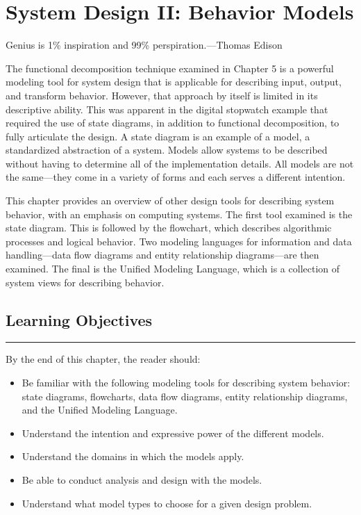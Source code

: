 \chapter{System Design II: Behavior Models}
\label{chapter:behaviorModels}
\graphicspath{ {./chapter06/Fig} }

\begin{itquote}
Genius is 1\% inspiration and 99\% perspiration.---Thomas Edison
\end{itquote}


The functional decomposition technique examined in Chapter 5 is a
powerful modeling tool for system design that is applicable for
describing input, output, and transform behavior. However, that approach
by itself is limited in its descriptive ability. This was apparent in
the digital stopwatch example that required the use of state diagrams,
in addition to functional decomposition, to fully articulate the design.
A state diagram is an example of a model, a standardized abstraction of
a system. Models allow systems to be described without having to
determine all of the implementation details. All models are not the
same---they come in a variety of forms and each serves a different
intention.

This chapter provides an overview of other design tools for describing
system behavior, with an emphasis on computing systems. The first tool
examined is the state diagram. This is followed by the flowchart, which
describes algorithmic processes and logical behavior. Two modeling
languages for information and data handling---data flow diagrams and
entity relationship diagrams---are then examined. The final is the
Unified Modeling Language, which is a collection of system views for
describing behavior.

\section*{Learning Objectives}
\noindent\rule{\linewidth}{1pt}
By the end of this chapter, the reader should:

\begin{itemize}
\item
  Be familiar with the following modeling tools for describing system
  behavior: state diagrams, flowcharts, data flow diagrams, entity
  relationship diagrams, and the Unified Modeling Language.
\item
  Understand the intention and expressive power of the different models.
\item
  Understand the domains in which the models apply.
\item
  Be able to conduct analysis and design with the models.
\item
  Understand what model types to choose for a given design problem.
\end{itemize}

